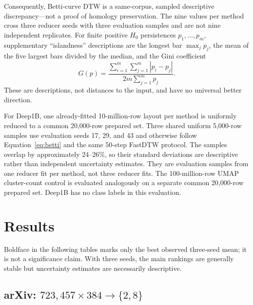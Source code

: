 \documentclass[10pt]{article}
\begin{document}
Consequently, Betti-curve DTW is a same-corpus, sampled descriptive discrepancy---not a
proof of homology preservation.  The nine values per method cross three reducer seeds
with three evaluation samples and are not nine independent replicates.  For finite
positive $H_0$ persistences $p_1,\ldots,p_m$, supplementary ``islandness'' descriptions
are the longest bar $\max_jp_j$, the mean of the five largest bars divided by the median,
and the Gini coefficient
\[
 G(p)=\frac{\sum_{i=1}^m\sum_{j=1}^m|p_i-p_j|}
            {2m\sum_{j=1}^m p_j}.
\]
These are descriptions, not distances to the input, and have no universal better
direction.

For Deep1B, one already-fitted 10-million-row layout per method is uniformly reduced to
a common 20,000-row prepared set.  Three shared uniform 5,000-row samples use evaluation
seeds 17, 29, and 43 and otherwise follow Equation~\eqref{eq:betti} and the same 50-step
FastDTW protocol.  The samples overlap by approximately 24--26\%, so their standard
deviations are descriptive rather than independent uncertainty estimates.  They are
evaluation samples from one reducer fit per method, not three reducer fits.  The
100-million-row UMAP cluster-count control is evaluated analogously on a separate common
20,000-row prepared set.  Deep1B has no class labels in this evaluation.

\section{Results}

Boldface in the following tables marks only the best observed three-seed mean; it is not
a significance claim.  With three seeds, the main rankings are generally stable but
uncertainty estimates are necessarily descriptive.

\subsection{arXiv: \texorpdfstring{$723{,}457\times384\to\{2,8\}$}{723,457 x 384 to 2-D and 8-D}}
\end{document}
